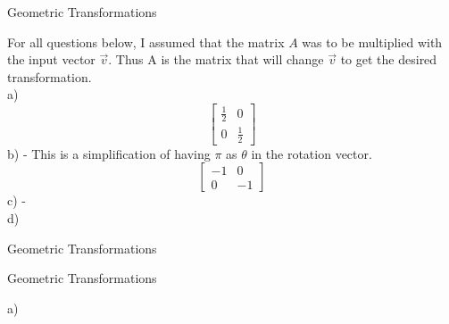 \documentclass[12pt]{article}
\newcommand{\sqbrl}{\left[}
\newcommand{\sqbrr}{\right]}
\newenvironment{problem}[2][Problem]{\begin{trivlist}
\item[\hskip \labelsep {\bfseries #1}\hskip \labelsep {\bfseries #2.}]}{\end{trivlist}}
\begin{document}
\begin{problem}{5}
	Geometric Transformations
\end{problem}
For all questions below, I assumed that the matrix $A$ was to be multiplied with the input vector $\vec v$. Thus A is the matrix that will change $\vec v$ to get the desired transformation.\\
a)\\
	\[\sqbrl\begin{matrix}\frac{1}{2} & 0\\0 & \frac{1}{2}\end{matrix}\sqbrr\]
b) - This is a simplification of having $\pi$ as $\theta$ in the rotation vector.\\
	\[\sqbrl\begin{matrix}-1 & 0\\0 & -1\end{matrix}\sqbrr\]
c) - \\

d) \\

\begin{problem}{6}
	Geometric Transformations
\end{problem}

\begin{problem}{7}
	Geometric Transformations
\end{problem}
a)\\
\end{document}
